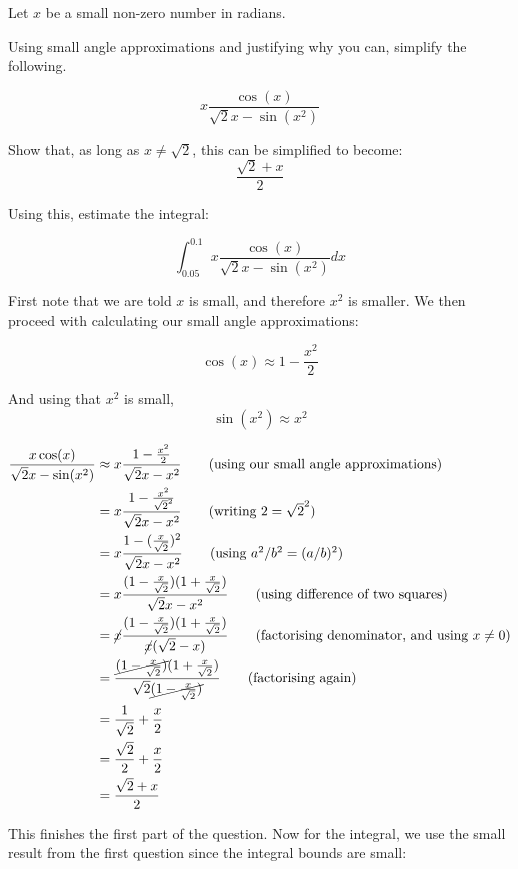 \begin{example}
    Let $x$ be a small non-zero number in radians.

    Using small angle approximations and justifying why you can, simplify the following.

    \[ x\frac{\cos(x)}{\sqrt{2}x - \sin(x^2)} \]

    Show that, as long as $x \neq \sqrt{2}$, this can be simplified to become:
    \[ \frac{\sqrt{2} + x}{2}\]

    Using this, estimate the integral:

    \[ \int_{0.05}^{0.1} x\frac{\cos(x)}{\sqrt{2}x - \sin(x^2)} dx \]
\end{example}
\begin{solution}
    
    First note that we are told $x$ is small, and therefore $x^2$ is smaller. We then proceed with calculating our small angle approximations:

    \[\cos(x) \approx 1 - \frac{x^2}{2} \]

    And using that $x^2$ is small,
    \[ \sin(x^2) \approx x^2\]

    \begin{align*}
        \frac{x\cos(x)}{\sqrt{2}x - \sin(x^2)} &\approx x\frac{1 - \frac{x^2}{2}}{\sqrt{2}x - x^2}  \tag{using our small angle approximations}\\
        &= x\frac{1 - \frac{x^2}{\sqrt{2}^2}}{\sqrt{2}x - x^2} \tag{writing $2 = \sqrt{2}^2$}\\
        &= x\frac{1 - (\frac{x}{\sqrt{2}})^2}{\sqrt{2}x - x^2} \tag{using $a^2/b^2 = (a/b)^2$}\\
        &= x\frac{(1 - \frac{x}{\sqrt{2}})(1 + \frac{x}{\sqrt{2}})}{\sqrt{2}x - x^2} \tag{using difference of two squares}\\
        &= \cancel{x}\frac{(1 - \frac{x}{\sqrt{2}})(1 + \frac{x}{\sqrt{2}})}{\cancel{x}(\sqrt{2} - x)} \tag{factorising denominator, and using $x\neq0$}\\
        &= \frac{\cancel{(1 - \frac{x}{\sqrt{2}})}(1 + \frac{x}{\sqrt{2}})}{\sqrt{2}\cancel{(1 - \frac{x}{\sqrt{2}})}} \tag{factorising again} \\
        &= \frac{1}{\sqrt{2}} + \frac{x}{2}\\
        &= \frac{\sqrt{2}}{2}+ \frac{x}{2} \\
        &= \frac{\sqrt{2} + x}{2}
    \end{align*}

    This finishes the first part of the question. Now for the integral, we use the small result from the first question since the integral bounds are small:


\end{solution}
